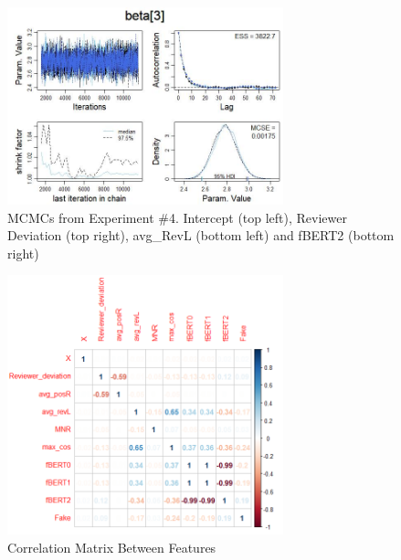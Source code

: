 \begin{figure}
\includegraphics[width=8cm]{BERTExp4.jpg}
\caption{MCMCs from Experiment \#4. Intercept (top left), Reviewer Deviation (top right), avg\_RevL (bottom left) and fBERT2 (bottom right)}
\label{Exp4MCMC}
\end{figure}

\begin{figure}
\includegraphics[width=8cm]{corrplot.png}
\caption{Correlation Matrix Between Features}
\label{corr}
\end{figure}


